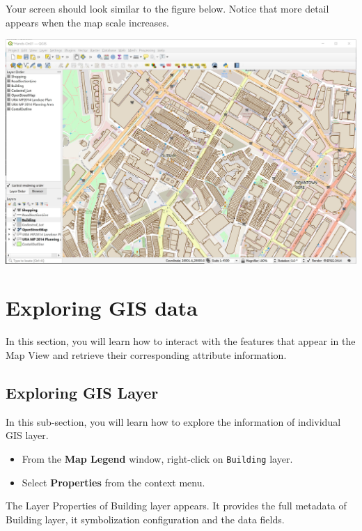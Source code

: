 \documentclass[
  letterpaper,
  DIV=11,
  numbers=noendperiod]{scrreprt}
\providecommand{\tightlist}{%
  \setlength{\itemsep}{0pt}\setlength{\parskip}{0pt}}\usepackage{longtable,booktabs,array}
\begin{document}
Your screen should look similar to the figure below. Notice that more
detail appears when the map scale increases.

\includegraphics{./img/image1-17.jpg}

\hypertarget{exploring-gis-data}{%
\section{Exploring GIS data}\label{exploring-gis-data}}

In this section, you will learn how to interact with the features that
appear in the Map View and retrieve their corresponding attribute
information.

\hypertarget{exploring-gis-layer}{%
\subsection{Exploring GIS Layer}\label{exploring-gis-layer}}

In this sub-section, you will learn how to explore the information of
individual GIS layer.

\begin{itemize}
\tightlist
\item
  From the \textbf{Map Legend} window, right-click on \texttt{Building}
  layer.
\item
  Select \textbf{Properties} from the context menu.
\end{itemize}

The Layer Properties of Building layer appears. It provides the full
metadata of Building layer, it symbolization configuration and the data
fields.
\end{document}
